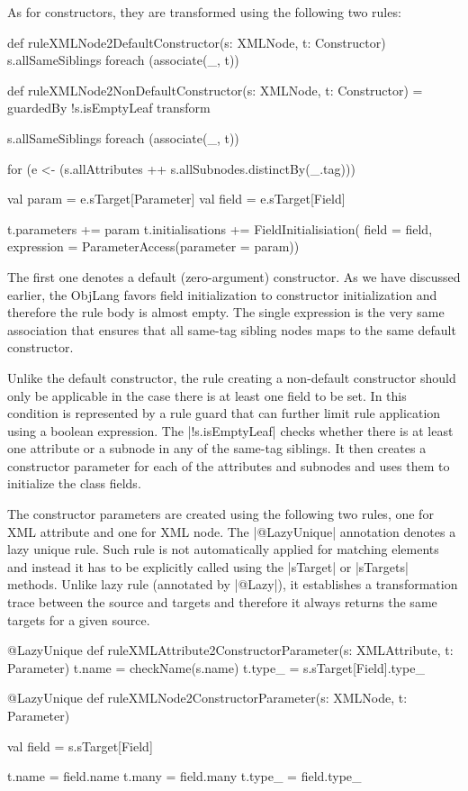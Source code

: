 As for constructors, they are transformed using the following two rules:
%
\begin{scalacode}
def ruleXMLNode2DefaultConstructor(s: XMLNode, t: Constructor) {
  s.allSameSiblings foreach (associate(_, t))
}

def ruleXMLNode2NonDefaultConstructor(s: XMLNode, t: Constructor) = guardedBy {
  !s.isEmptyLeaf
} transform {

  s.allSameSiblings foreach (associate(_, t))

  for (e <- (s.allAttributes ++ s.allSubnodes.distinctBy(_.tag))) {
    val param = e.sTarget[Parameter]
    val field = e.sTarget[Field]

    t.parameters += param
    t.initialisations += FieldInitialisiation(
      field = field,
      expression = ParameterAccess(parameter = param))
  }
}
\end{scalacode}
%
The first one denotes a default (zero-argument) constructor.
As we have discussed earlier, the ObjLang favors field initialization to constructor initialization and therefore the rule body is almost empty.
The single expression is the very same association that ensures that all same-tag sibling nodes maps to the same default constructor.

Unlike the default constructor, the rule creating a non-default constructor should only be applicable in the case there is at least one field to be set.
In \SIGMA this condition is represented by a rule guard that can further limit rule application using a boolean expression.
The \Scala|!s.isEmptyLeaf| checks whether there is at least one attribute or a subnode in any of the same-tag siblings.
It then creates a constructor parameter for each of the attributes and subnodes and uses them to initialize the class fields.

The constructor parameters are created using the following two rules, one for XML attribute and one for XML node.
The \Scala|@LazyUnique| annotation denotes a lazy unique rule.
Such rule is not automatically applied for matching elements and instead it has to be explicitly called using the \Scala|sTarget| or \Scala|sTargets| methods.
Unlike lazy rule (annotated by \Scala|@Lazy|), it establishes a transformation trace between the source and targets and therefore it always returns the same targets for a given source.
%
\begin{scalacode}
@LazyUnique
def ruleXMLAttribute2ConstructorParameter(s: XMLAttribute, t: Parameter) {
  t.name = checkName(s.name)
  t.type_ = s.sTarget[Field].type_
}

@LazyUnique
def ruleXMLNode2ConstructorParameter(s: XMLNode, t: Parameter) {
  val field = s.sTarget[Field]

  t.name = field.name
  t.many = field.many
  t.type_ = field.type_
}
\end{scalacode}

